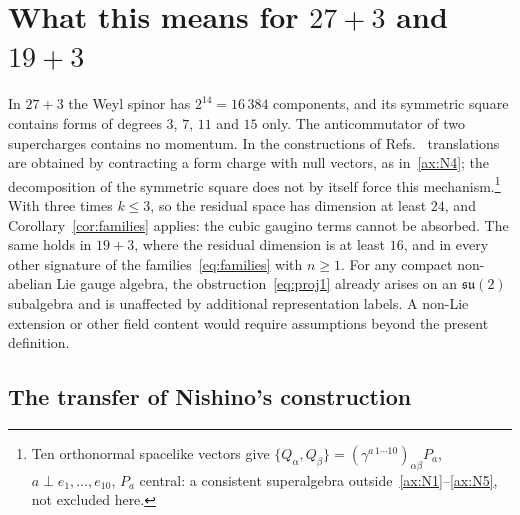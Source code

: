 \section{What this means for \texorpdfstring{$27+3$}{27+3} and \texorpdfstring{$19+3$}{19+3}}
\label{sec:consequences}

In $27+3$ the Weyl spinor has $2^{14}=16\,384$ components, and its symmetric square contains forms of degrees $3$, $7$, $11$ and $15$ only. The anticommutator of two supercharges contains no momentum. In the constructions of Refs.~\cite{NishinoSezgin1996,Sezgin1997,Nishino1998} translations are obtained by contracting a form charge with null vectors, as in~\ref{ax:N4}; the decomposition of the symmetric square does not by itself force this mechanism.\footnote{Ten orthonormal spacelike vectors give $\{Q_\alpha,Q_\beta\}=(\gamma^{a\,1\cdots10})_{\alpha\beta}P_a$, $a\perp e_1,\dots,e_{10}$, $P_a$ central: a consistent superalgebra outside~\ref{ax:N1}--\ref{ax:N5}, not excluded here.} With three times $k\le3$, so the residual space has dimension at least $24$, and Corollary~\ref{cor:families} applies: the cubic gaugino terms cannot be absorbed. The same holds in $19+3$, where the residual dimension is at least $16$, and in every other signature of the families~\eqref{eq:families} with $n\ge1$. For any compact non-abelian Lie gauge algebra, the obstruction~\eqref{eq:proj1} already arises on an $\mathfrak{su}(2)$ subalgebra and is unaffected by additional representation labels. A non-Lie extension or other field content would require assumptions beyond the present definition.

\subsection{The transfer of Nishino's construction}
\label{ssec:transfer}

